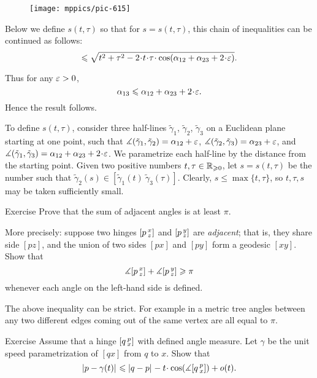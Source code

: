 \begin{wrapfigure}{o}{30 mm}
\vskip-0mm
\centering
\texttt{[image: mppics/pic-615]}
\vskip3mm
\end{wrapfigure}

Below we define 
$s(t,\tau)$ so that for 
$s=s(t,\tau)$, this chain of inequalities can be continued as follows:
\[\le
\sqrt{t^2+\tau^2-2\cdot t\cdot \tau\cdot \cos(\alpha_{12}+\alpha_{23}+2\cdot \eps)}.
\]

Thus for any $\varepsilon>0$, 
\[\alpha_{13}\le \alpha_{12}+\alpha_{23}+2\cdot \eps.\]
Hence the result follows.

To define $s(t,\tau)$, consider three half-lines $\tilde \gamma_1$, $\tilde \gamma_2$, $\tilde \gamma_3$ on a Euclidean plane starting at one point, such that
$\mangle(\tilde \gamma_1,\tilde \gamma_2)\z=\alpha_{12}+\eps$,
$\mangle(\tilde \gamma_2,\tilde \gamma_3)\z=\alpha_{23}+\eps$,
and $\mangle(\tilde \gamma_1,\tilde \gamma_3)\z=\alpha_{12}\z+\alpha_{23}\z+2\cdot \eps$.
We parametrize each half-line by the distance from the starting point.
Given two positive numbers $t,\tau\in\mathbb{R}_{\geqslant0}$, let $s=s(t,\tau)$ be 
the number such that 
$\tilde \gamma_2(s)\in[\tilde \gamma_1(t)\ \tilde \gamma_3(\tau)]$. 
Clearly, $s\le\max\{t,\tau\}$, so $t,\tau,s$ may be taken sufficiently small.
\qeds 

\begin{thm}{Exercise}\label{ex:adjacent-angles}
Prove that the sum of adjacent angles is at least $\pi$.

More precisely: suppose two hinges $[p\,{}^{x}_{z}]$ and $[p\,{}^{y}_{z}]$ are \emph{adjacent};
that is, they share side $[pz]$, and the union of two sides $[px]$ and $[py]$ form a geodesic $[xy]$.
Show that
\[\measuredangle[p\,{}^{x}_{z}]+\measuredangle[p\,{}^{y}_{z}]\geqslant \pi\]
whenever  each angle on the left-hand side is defined.
\end{thm}

The above inequality can be strict.
For example in a metric tree angles between any two different edges coming out of the same vertex are all equal to $\pi$.

\begin{thm}{Exercise}\label{ex:first-var}
Assume that a hinge $[q\,{}^{p}_{x}]$ with defined angle measure.
Let $\gamma$ be the unit speed parametrization of $[qx]$ from $q$ to $x$.
Show that
\[\dist{p}{\gamma(t)}{}
\le
\dist{q}{p}{}-t\cdot \cos(\mangle\hinge q p x)+o(t).\]

\end{thm}

